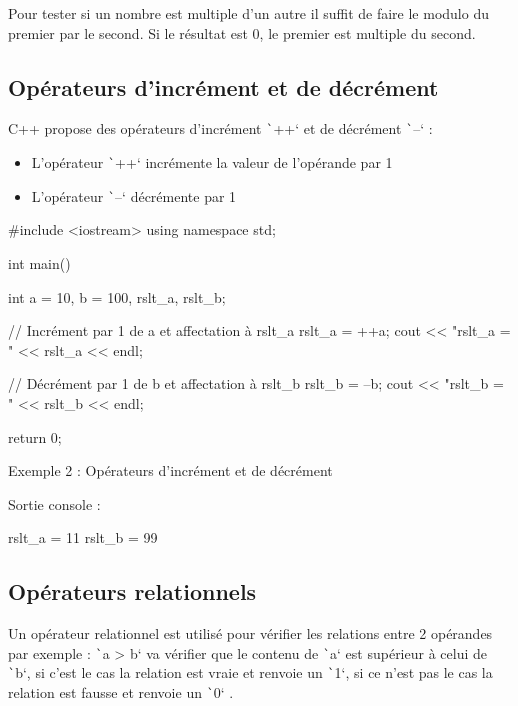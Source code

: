 \documentclass[10pt]{article}
\begin{document}
Pour tester si un nombre est multiple d'un autre il suffit de faire le modulo du premier par le second. Si le résultat est 0, le premier est
multiple du second.


\subsection{Opérateurs d'incrément et de décrément}
C++ propose des opérateurs d'incrément \texttt`++` et de décrément \texttt`--` :
\begin{itemize}
    \item L'opérateur \texttt`++` incrémente la valeur de l'opérande par 1
    \item L'opérateur \texttt`--` décrémente par 1
\end{itemize}

\begin{cppcode}
    #include <iostream>
    using namespace std;

    int main() {
        int a = 10, b = 100, rslt_a, rslt_b;

        // Incrément par 1 de a et affectation à rslt_a
        rslt_a = ++a;
        cout << "rslt_a = " << rslt_a << endl;


        // Décrément par 1 de b et affectation à rslt_b
        rslt_b = --b;
        cout << "rslt_b = " << rslt_b << endl;

        return 0;
    }
\end{cppcode}
\caption{Exemple 2 : Opérateurs d'incrément et de décrément}

\bigskip
Sortie console :

\begin{textcode}
    rslt_a = 11
    rslt_b = 99
\end{textcode}

\subsection{Opérateurs relationnels}
Un opérateur relationnel est utilisé pour vérifier les relations entre 2 opérandes par exemple : \texttt`a > b` va vérifier que le 
contenu de \texttt`a` est supérieur à celui de \texttt`b`, si c'est le cas la relation est vraie et renvoie
un \texttt`1`, si ce n'est pas le cas la relation est fausse et renvoie un \texttt`0` .
\end{document}
